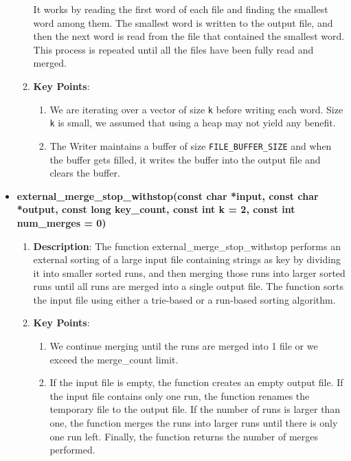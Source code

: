 \documentclass{article}
\begin{document}
\begin{itemize}
\begin{enumerate}[label = \star]
                    It works by reading the first word of each file and finding the smallest word among them. The smallest word is written to the output file, and then the next word is read from the file that contained the smallest word. This process is repeated until all the files have been fully read and merged. 
                    \item \textbf{Key Points}: 
                        \begin{enumerate}
                            \item We are iterating over a vector of size \verb|k| before writing each word. Size \verb|k| is small, we assumed that using a heap may not yield any benefit.
                            \item The Writer maintains a buffer of size \verb|FILE_BUFFER_SIZE| and when the buffer gets filled, it writes the buffer into the output file and clears the buffer.
                        \end{enumerate}
                \end{enumerate}
            \item \textbf{external\_merge\_stop\_withstop(const char *input, const char *output,
                                 const long key\_count, const int k = 2,
                                 const int num\_merges = 0)}
                \begin{enumerate}[label=\star]
                    \item \textbf{Description}: The function external\_merge\_stop\_withstop performs an external sorting of a large input file containing strings as key by dividing it into smaller sorted runs, and then merging those runs into larger sorted runs until all runs are merged into a single output file.  
                    The function sorts the input file using either a trie-based or a run-based sorting algorithm.
                    \item \textbf{Key Points}: 
                        \begin{enumerate}
                            \item We continue merging until the runs are merged into 1 file or we exceed the merge\_count limit.
                            \item If the input file is empty, the function creates an empty output file. If the input file contains only one run, the function renames the temporary file to the output file. If the number of runs is larger than one, the function merges the runs into larger runs until there is only one run left. Finally, the function returns the number of merges performed. 

\end{enumerate}
\end{enumerate}
\end{itemize}
\end{document}
